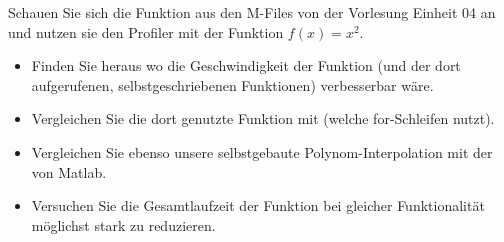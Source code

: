 \begin{aufg}[0]
Schauen Sie sich die Funktion  aus den M-Files von der Vorlesung Einheit 04 an und nutzen sie den Profiler mit der Funktion $f(x) = x^2$.

\begin{itemize}
 \item Finden Sie heraus  wo die Geschwindigkeit der Funktion (und der dort aufgerufenen, selbstgeschriebenen Funktionen) verbesserbar wäre. 
\item Vergleichen Sie die dort genutzte Funktion  mit  
(welche for-Schleifen nutzt). 
\item Vergleichen Sie ebenso unsere selbstgebaute Polynom-Interpolation mit der von Matlab.
\item Versuchen Sie die Gesamtlaufzeit der Funktion bei gleicher Funktionalität möglichst stark zu reduzieren.
\end{itemize}

\end{aufg}